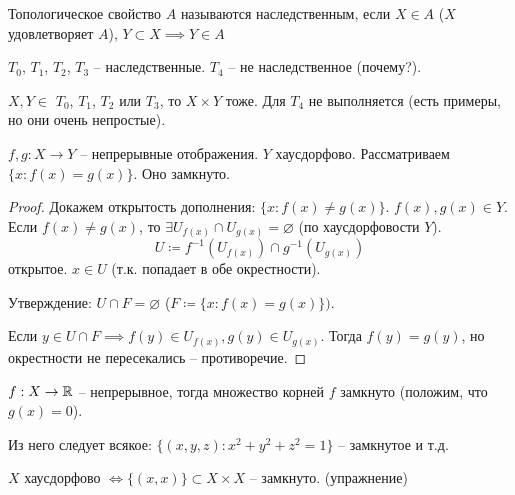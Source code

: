 \documentclass[main]{subfiles}
\begin{document}
\begin{definition}
    Топологическое свойство $A$ называются наследственным, если $X \in A$ ($X$ удовлетворяет $A$),
    $Y \subset X \implies Y \in A$
\end{definition}
\begin{example}
    $T_0$, $T_1$, $T_2$, $T_3$ -- наследственные.
    $T_4$ -- не наследственное (почему?).
\end{example}
\begin{remark}
    $X,Y \in$ $T_0$, $T_1$, $T_2$ или $T_3$, то $X \times Y$ тоже.
    Для $T_4$ не выполняется (есть примеры, но они очень непростые).
\end{remark}

\begin{theorem}
    $f, g: X \to Y$ -- непрерывные отображения. $Y$ хаусдорфово.
    Рассматриваем $\{x: f(x) = g(x)\}$. Оно замкнуто.
\end{theorem}
\begin{proof}
    Докажем открытость дополнения: $\{x: f(x) \neq g(x)\}$.
    $f(x), g(x) \in Y$.
    Если $f(x) \neq g(x)$, то $\exists U_{f(x)} \cap U_{g(x)} = \varnothing$ (по хаусдорфовости $Y$).
    \[U \coloneqq f^{-1}(U_{f(x)}) \cap g^{-1}(U_{g(x)})\]
    открытое.
    $x \in U$ (т.к. попадает в обе окрестности).

    Утверждение: $U \cap F = \varnothing$ ($F \coloneqq\{x: f(x) = g(x)\})$.

    Если $y \in U \cap F \implies f(y) \in U_{f(x)}, g(y)\in U_{g(x)}$.
    Тогда $f(y) = g(y)$, но окрестности не пересекались -- противоречие.
\end{proof}
\begin{corollary}
    $f: X \to \mathbb{R}$ -- непрерывное, тогда множество корней $f$ замкнуто (положим, что $g(x) = 0$).
\end{corollary}

Из него следует всякое:
$\{(x,y,z): x^2 + y^2 +z^2 =1\}$ -- замкнутое и т.д.

\begin{remark}
    $X$ хаусдорфово $\Leftrightarrow \{(x,x)\} \subset X \times X$ -- замкнуто. (упражнение)
\end{remark}
\end{document}
